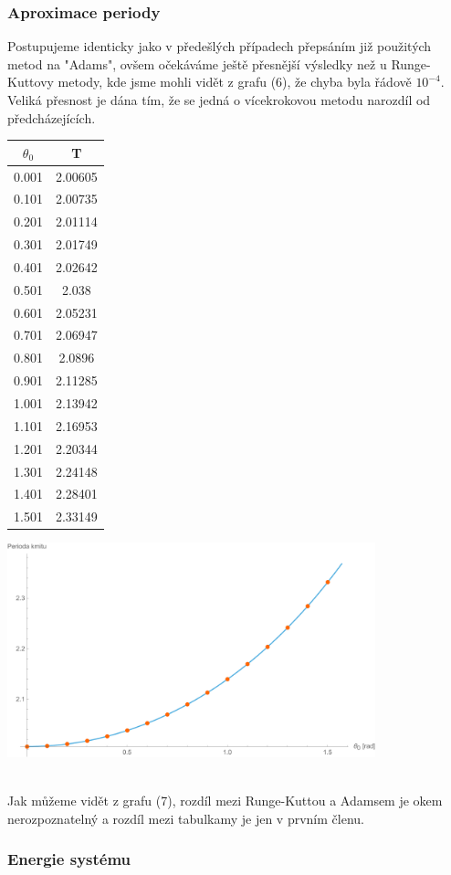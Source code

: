 \documentclass[reqno, a4paper]{amsart}
\begin{document}
			\subsubsection{Aproximace periody}
			Postupujeme identicky jako v předešlých případech přepsáním již použitých metod na "Adams", ovšem očekáváme ještě přesnější výsledky než u Runge-Kuttovy metody, kde jsme mohli vidět z grafu (6), že chyba byla řádově $10^{-4}$. Veliká přesnost je dána tím, že se jedná o vícekrokovou metodu narozdíl od předcházejících.
			\\
			\begin{minipage}{\textwidth}
				\begin{minipage}[b]{0.25\textwidth}
					\centering
					\begin{tabular}{|c|c|}
						\hline
						$\theta_{0}$ & T \\ 
						\hline
						0.001& 2.00605\\0.101& 2.00735\\0.201& 2.01114\\0.301& 2.01749\\0.401& 2.02642\\0.501& 2.038\\0.601& 2.05231\\0.701& 2.06947\\0.801& 2.0896\\0.901& 2.11285\\1.001& 2.13942
						\\1.101& 2.16953\\1.201& 2.20344\\1.301& 2.24148\\1.401& 2.28401\\1.501& 2.33149\\
						\hline
					\end{tabular}
				\end{minipage}
			\begin{minipage}[b]{0.79\textwidth}
				\centering
				\includegraphics[width=0.8\textwidth]{Runge - Kutta, Perioda}
			\end{minipage}
			\hfill
		\end{minipage}
	\\
	Jak můžeme vidět z grafu (7), rozdíl mezi Runge-Kuttou a Adamsem je okem nerozpoznatelný a rozdíl mezi tabulkamy je jen v prvním členu.
	\subsubsection{Energie systému}
	
	
			
\end{document}
